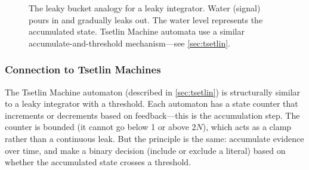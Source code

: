 \begin{figure}[htbp]
\centering
{}
\caption{The leaky bucket analogy for a leaky integrator. Water (signal)
  pours in and gradually leaks out. The water level represents the
  accumulated state. Tsetlin Machine automata use a similar
  accumulate-and-threshold mechanism---see \cref{sec:tsetlin}.}
\label{fig:leaky-bucket}
\end{figure}

\subsubsection{Connection to Tsetlin Machines}

The Tsetlin Machine automaton (described in \cref{sec:tsetlin})
is structurally similar to a leaky integrator with a threshold.
Each automaton has a state counter that increments or decrements
based on feedback---this is the accumulation step. The counter
is bounded (it cannot go below 1 or above $2N$), which acts as
a clamp rather than a continuous leak. But the principle is the
same: accumulate evidence over time, and make a binary decision
(include or exclude a literal) based on whether the accumulated
state crosses a threshold.

